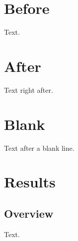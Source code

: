 \documentclass{article}
\begin{document}
\tableofcontents
{}
\section*{Before}
Text.

\section*{After}
Text right after.

\section*{Blank}

Text after a blank line.

\section{Results}
\subsection*{Overview}
Text.
\end{document}
